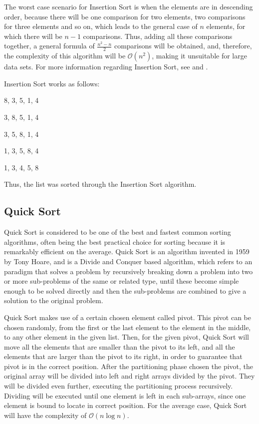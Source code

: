 \documentclass[]{article}
\begin{document}
The worst case scenario for Insertion Sort is when the elements are in descending order, because there will be one comparison for two elements, two comparisons for three elements and so on, which leads to the general case of $n$ elements, for which there will be $n-1$ comparisons. Thus, adding all these comparisons together, a general formula of $\textstyle\frac{n^2-n}{2}$ comparisons will be obtained, and, therefore, the complexity of this algorithm will be $\mathcal{O}(n^2)$, making it unsuitable for large data sets. For more information regarding Insertion Sort, see \cite{Knuth:1998:Vol3} and \cite{Cormen:2009:IAT}. 

\noindent
Insertion Sort works as follows:
\begin{center}
8, 3, 5, 1, 4

3, 8, 5, 1, 4

3, 5, 8, 1, 4

1, 3, 5, 8, 4

1, 3, 4, 5, 8
\end{center}
Thus, the list was sorted through the Insertion Sort algorithm.
	
\pagebreak

	\subsection{Quick Sort}
Quick Sort is considered to be one of the best and fastest common sorting algorithms, often being the best practical choice for sorting because it is remarkably efficient on the average. Quick Sort is an algorithm invented in 1959 by Tony Hoare, and is a Divide and Conquer based algorithm, which refers to an paradigm that solves a problem by recursively breaking down a problem into two or more sub-problems of the same or related type, until these become simple enough to be solved directly and then the sub-problems are combined to give a solution to the original problem. 

Quick Sort makes use of a certain chosen element called pivot. This pivot can be chosen randomly, from the first or the last element to the element in the middle, to any other element in the given list. Then, for the given pivot, Quick Sort will move all the elements that are smaller than the pivot to its left, and all the elements that are larger than the pivot to its right, in order to guarantee that pivot is in the correct position.
After the partitioning phase chosen the pivot, the original array will be divided into left and right arrays divided by the pivot. They will be divided even further, executing the partitioning process recursively. Dividing will be executed until one element is left in each sub-arrays, since one element is bound to locate in correct position. For the average case, Quick Sort will have the complexity of $\mathcal{O}(n\log{}n)$.
\end{document}
